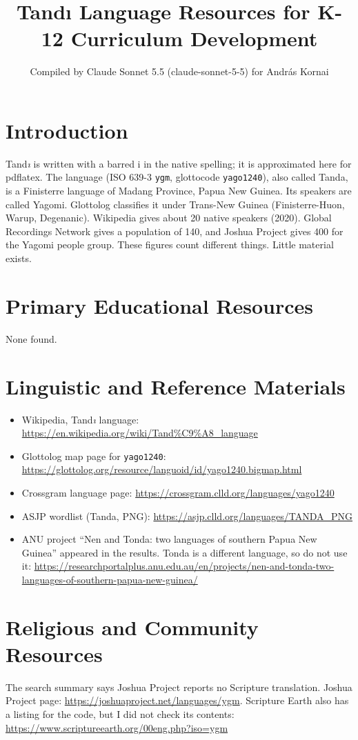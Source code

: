 \documentclass[12pt]{article}
\title{Tand{\i} Language Resources for K-12 Curriculum Development}
\author{Compiled by Claude Sonnet 5.5 (claude-sonnet-5-5) for Andr\'as Kornai}
\date{}
\begin{document}
\maketitle

\section{Introduction}
Tand\textit{\i} is written with a barred i in the native spelling; it is approximated here for pdflatex. The language (ISO 639-3 \texttt{ygm}, glottocode \texttt{yago1240}), also called Tanda, is a Finisterre language of Madang Province, Papua New Guinea. Its speakers are called Yagomi. Glottolog classifies it under Trans-New Guinea (Finisterre-Huon, Warup, Degenanic). Wikipedia gives about 20 native speakers (2020). Global Recordings Network gives a population of 140, and Joshua Project gives 400 for the Yagomi people group. These figures count different things. Little material exists.

\section{Primary Educational Resources}
None found.

\section{Linguistic and Reference Materials}
\begin{itemize}
\item Wikipedia, Tand\textit{\i} language: \url{https://en.wikipedia.org/wiki/Tand%C9%A8_language}
\item Glottolog map page for \texttt{yago1240}: \url{https://glottolog.org/resource/languoid/id/yago1240.bigmap.html}
\item Crossgram language page: \url{https://crossgram.clld.org/languages/yago1240}
\item ASJP wordlist (Tanda, PNG): \url{https://asjp.clld.org/languages/TANDA_PNG}
\item ANU project ``Nen and Tonda: two languages of southern Papua New Guinea'' appeared in the results. Tonda is a different language, so do not use it: \url{https://researchportalplus.anu.edu.au/en/projects/nen-and-tonda-two-languages-of-southern-papua-new-guinea/}
\end{itemize}

\section{Religious and Community Resources}
The search summary says Joshua Project reports no Scripture translation. Joshua Project page: \url{https://joshuaproject.net/languages/ygm}. Scripture Earth also has a listing for the code, but I did not check its contents: \url{https://www.scriptureearth.org/00eng.php?iso=ygm}
\end{document}
